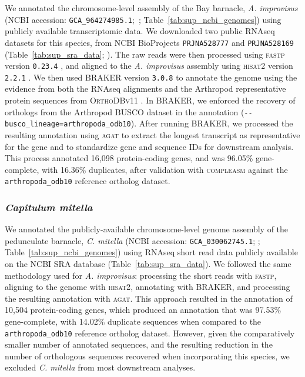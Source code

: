We annotated the chromosome-level assembly of the Bay barnacle, \textit{A. improvisus}
(NCBI accession: \texttt{GCA\_964274985.1};~\cite{bishop_genome_2025};
Table~\ref{tab:sup_ncbi_genomes}) using publicly available transcriptomic data.
We downloaded two public RNAseq datasets for this species, from NCBI BioProjects
\texttt{PRJNA528777} and \texttt{PRJNA528169} (Table~\ref{tab:sup_sra_data};
\cite{abramova_sensory_2019}).
The raw reads were then processed using \textsc{fastp} version \texttt{0.23.4}
\citep{chen_ultrafast_2023,chen_fastp_2018}, and aligned to the \textit{A. improvisus}
assembly using \textsc{hisat2} version \texttt{2.2.1} \citep{kim_graph-based_2019}.
We then used \textsc{BRAKER} version \texttt{3.0.8} \citep{gabriel_braker3_2024} to
annotate the genome using the evidence from both the RNAseq alignments and the
Arthropod representative protein sequences from \textsc{OrthoDBv11}
\citep{kriventseva_orthodb_2019,zdobnov_orthodb_2021}.
In \textsc{BRAKER}, we enforced the recovery of orthologs from the Arthropod
\textsc{BUSCO} dataset in the annotation (\texttt{-{}-busco\_lineage=arthropoda\_odb10}).
After running \textsc{BRAKER}, we processed the resulting annotation using \textsc{agat}
to extract the longest transcript as representative for the gene and to standardize gene
and sequence IDs for downstream analysis.
This process annotated 16{,}098 protein-coding genes, and was 96.05\% gene-complete,
with 16.36\% duplicates, after validation with \textsc{compleasm} against the
\texttt{arthropoda\_odb10} reference ortholog dataset.

\subsubsection*{\textit{Capitulum mitella}}

We annotated the publicly-available chromosome-level genome assembly of the pedunculate
barnacle, \textit{C. mitella} (NCBI accession: \texttt{GCA\_030062745.1};
\cite{chen_capmit_2021}; Table~\ref{tab:sup_ncbi_genomes}) using RNAseq short read data
publicly available on the NCBI SRA database (Table~\ref{tab:sup_sra_data}).
We followed the same methodology used for \textit{A. improvisus}: processing the
short reads with \textsc{fastp}, aligning to the genome with \textsc{hisat2}, annotating
with \textsc{BRAKER}, and processing the resulting annotation with \textsc{agat}.
This approach resulted in the annotation of 10{,}504 protein-coding genes, which
produced an annotation that was 97.53\% gene-complete, with 14.02\% duplicate sequences
when compared to the \texttt{arthropoda\_odb10} reference ortholog dataset.
However, given the comparatively smaller number of annotated sequences, and the
resulting reduction in the number of orthologous sequences recovered when incorporating
this species, we excluded \textit{C. mitella} from most downstream analyses.

